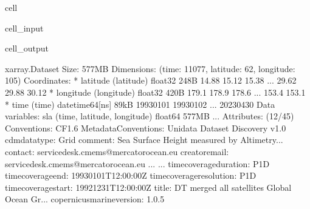 \documentclass[letterpaper,10pt,english]{jupyterBook}
\begin{document}
\begin{sphinxuseclass}{cell}\begin{sphinxVerbatimInput}

\begin{sphinxuseclass}{cell_input}
\begin{sphinxVerbatim}[commandchars=\\\{\}]
    

\end{sphinxVerbatim}

\end{sphinxuseclass}\end{sphinxVerbatimInput}
\begin{sphinxVerbatimOutput}

\begin{sphinxuseclass}{cell_output}
\begin{sphinxVerbatim}[commandchars=\\\{\}]
\PYGZlt{}xarray.Dataset\PYGZgt{} Size: 577MB
Dimensions:    (time: 11077, latitude: 62, longitude: 105)
Coordinates:
  * latitude   (latitude) float32 248B 14.88 15.12 15.38 ... 29.62 29.88 30.12
  * longitude  (longitude) float32 420B \PYGZhy{}179.1 \PYGZhy{}178.9 \PYGZhy{}178.6 ... \PYGZhy{}153.4 \PYGZhy{}153.1
  * time       (time) datetime64[ns] 89kB 1993\PYGZhy{}01\PYGZhy{}01 1993\PYGZhy{}01\PYGZhy{}02 ... 2023\PYGZhy{}04\PYGZhy{}30
Data variables:
    sla        (time, latitude, longitude) float64 577MB ...
Attributes: (12/45)
    Conventions:                     CF\PYGZhy{}1.6
    Metadata\PYGZus{}Conventions:            Unidata Dataset Discovery v1.0
    cdm\PYGZus{}data\PYGZus{}type:                   Grid
    comment:                         Sea Surface Height measured by Altimetry...
    contact:                         servicedesk.cmems@mercator\PYGZhy{}ocean.eu
    creator\PYGZus{}email:                   servicedesk.cmems@mercator\PYGZhy{}ocean.eu
    ...                              ...
    time\PYGZus{}coverage\PYGZus{}duration:          P1D
    time\PYGZus{}coverage\PYGZus{}end:               1993\PYGZhy{}01\PYGZhy{}01T12:00:00Z
    time\PYGZus{}coverage\PYGZus{}resolution:        P1D
    time\PYGZus{}coverage\PYGZus{}start:             1992\PYGZhy{}12\PYGZhy{}31T12:00:00Z
    title:                           DT merged all satellites Global Ocean Gr...
    copernicusmarine\PYGZus{}version:        1.0.5
\end{sphinxVerbatim}

\end{sphinxuseclass}\end{sphinxVerbatimOutput}

\end{sphinxuseclass}
\end{document}
